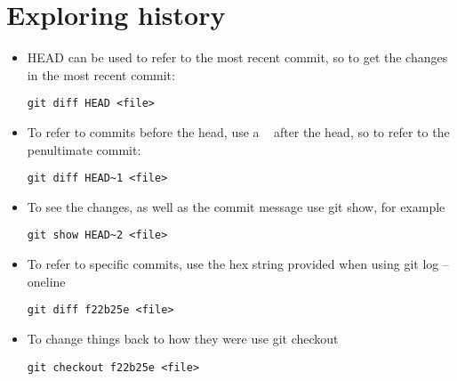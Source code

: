 \documentclass{article}[18pt]
\begin{document}
\section{Exploring history}
\begin{itemize}
\item HEAD can be used to refer to the most recent commit, so to get the changes in the most recent commit:
\begin{lstlisting}[mathescape=true]
git diff HEAD <file>
\end{lstlisting}
\item To refer to commits before the head, use a ~ after the head, so to refer to the penultimate commit:
\begin{lstlisting}[mathescape=true]
git diff HEAD~1 <file>
\end{lstlisting}
\item To see the changes, as well as the commit message use git show, for example
\begin{lstlisting}[mathescape=true]
git show HEAD~2 <file>
\end{lstlisting}
\item To refer to specific commits, use the hex string provided when using git log --oneline
\begin{lstlisting}[mathescape=true]
git diff f22b25e <file>
\end{lstlisting}
\item To change things back to how they were use git checkout
\begin{lstlisting}[mathescape=true]
git checkout f22b25e <file>
\end{lstlisting}

\end{itemize}
\end{document}
